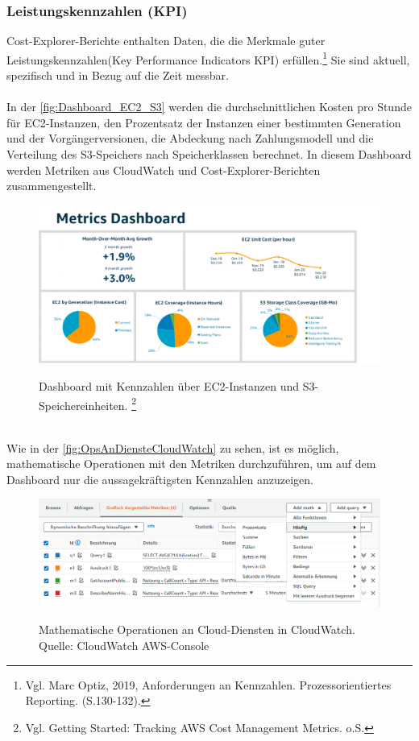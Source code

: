 \subsubsection*{Leistungskennzahlen (KPI)}
Cost-Explorer-Berichte enthalten Daten, die die Merkmale guter Leistungskennzahlen(Key Performance Indicators KPI) erfüllen.\footnote{Vgl. Marc Optiz, 2019, Anforderungen an Kennzahlen. Prozessorientiertes Reporting. (S.130-132).\cite{PR1}} Sie sind aktuell, spezifisch und in Bezug auf die Zeit messbar.
\\\\
In der \autoref{fig:Dashboard_EC2_S3} werden %
die durchschnittlichen Kosten pro Stunde für EC2-Instanzen, den Prozentsatz der Instanzen einer bestimmten Generation und der Vorgängerversionen, die Abdeckung nach Zahlungsmodell und die Verteilung des S3-Speichers nach Speicherklassen berechnet. In diesem Dashboard werden Metriken aus CloudWatch und Cost-Explorer-Berichten zusammengestellt.
\begin{figure}[h!]
  \centering
  \includegraphics[scale=0.65]{sources/Dashboard_EC2_S3}
  \caption[Dashboard mit EC2 und S3 Metriken]{}
  \label{fig:Dashboard_EC2_S3} 
  Dashboard mit Kennzahlen über EC2-Instanzen und S3-Speichereinheiten. \footnote{Vgl. Getting Started: Tracking AWS Cost Management Metrics. o.S.\cite{AMZ35}}
\end{figure}\\
Wie in der \autoref{fig:OpsAnDiensteCloudWatch} zu sehen, ist es möglich, mathematische Operationen mit den Metriken durchzuführen, um auf dem Dashboard nur die aussagekräftigsten Kennzahlen anzuzeigen.
\begin{figure}[h!]
  \centering
  \includegraphics[scale=0.55]{sources/OpsAnDiensteCloudWatch}
  \caption[Operationen an Cloud-Diensten in CloudWatch]{}
  \label{fig:OpsAnDiensteCloudWatch} 
  Mathematische Operationen an Cloud-Diensten in CloudWatch.\\
  Quelle: CloudWatch AWS-Console
\end{figure}
